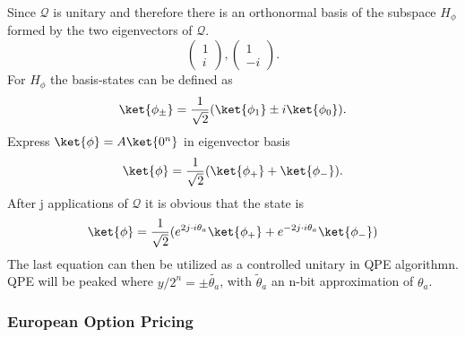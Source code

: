 \documentclass[../../main.tex]{subfiles}
\begin{document}
Since $\mathcal{Q}$ is unitary and therefore there is an orthonormal basis of the subspace $H_{\phi}$ formed
by the two eigenvectors of $\mathcal{Q}$.
\begin{equation}\label{eq:eigenvectors}
  \begin{pmatrix}
    1\\
    i
  \end{pmatrix}
  ,
  \begin{pmatrix}
    1\\
    -i
  \end{pmatrix}.
\end{equation}
For $H_{\phi}$ the basis-states can be defined as
\begin{equation}\label{eq:HBasisStates}
  \ket{\phi_{\pm}} = \frac{1}{\sqrt{2}} (\ket{\phi_1} \pm i \ket{\phi_0}).
\end{equation} 
Express $\ket{\phi} = A \ket{0^n}$ in eigenvector basis 
\begin{equation}
  \ket{\phi} = \frac{1}{\sqrt{2}} ( \ket{\phi_+} + \ket{\phi_-}).
\end{equation}
After j applications of $\mathcal{Q}$ it is obvious that the state is
\begin{equation}\label{eq:PhiAfterJQ}
  \ket{\phi} = \frac{1}{\sqrt{2}} ( e^{2j \cdot i \theta_a}\ket{\phi_+} + e^{-2j \cdot i \theta_a}\ket{\phi_-})
\end{equation}
The last equation can then be utilized as a controlled unitary in QPE algorithmn. QPE will be peaked where $y/2^n = \pm \tilde{\theta_a}$,
with $\tilde{\theta}_a$ an n-bit approximation of $\theta_a$.

\subsubsection{European Option Pricing}\label{sec:eurOpPricing}
\end{document}
